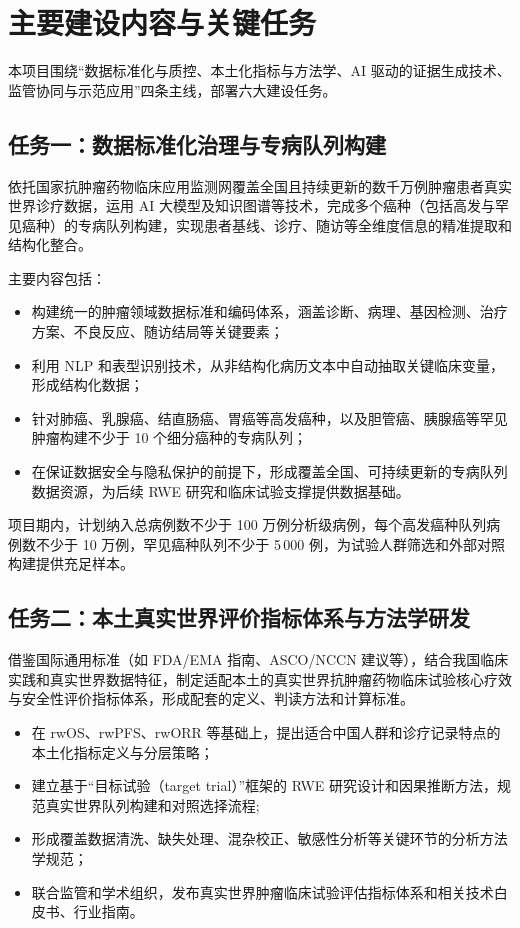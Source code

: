 \documentclass[12pt, a4paper, fontset=mac]{ctexart} %
\begin{document}
\section{主要建设内容与关键任务}

本项目围绕“数据标准化与质控、本土化指标与方法学、AI 驱动的证据生成技术、监管协同与示范应用”四条主线，部署六大建设任务。

\subsection*{任务一：数据标准化治理与专病队列构建}

依托国家抗肿瘤药物临床应用监测网覆盖全国且持续更新的数千万例肿瘤患者真实世界诊疗数据，运用 AI 大模型及知识图谱等技术，完成多个癌种（包括高发与罕见癌种）的专病队列构建，实现患者基线、诊疗、随访等全维度信息的精准提取和结构化整合\cite{ncc_internal_db}。

\vspace{0.5em}
主要内容包括：

\begin{itemize}
  \item 构建统一的肿瘤领域数据标准和编码体系，涵盖诊断、病理、基因检测、治疗方案、不良反应、随访结局等关键要素；
  \item 利用 NLP 和表型识别技术，从非结构化病历文本中自动抽取关键临床变量，形成结构化数据；
  \item 针对肺癌、乳腺癌、结直肠癌、胃癌等高发癌种，以及胆管癌、胰腺癌等罕见肿瘤构建不少于 10 个细分癌种的专病队列；
  \item 在保证数据安全与隐私保护的前提下，形成覆盖全国、可持续更新的专病队列数据资源，为后续 RWE 研究和临床试验支撑提供数据基础。
\end{itemize}

项目期内，计划纳入总病例数不少于 100 万例分析级病例，每个高发癌种队列病例数不少于 10 万例，罕见癌种队列不少于 5\,000 例，为试验人群筛选和外部对照构建提供充足样本。

\subsection*{任务二：本土真实世界评价指标体系与方法学研发}

借鉴国际通用标准（如 FDA/EMA 指南、ASCO/NCCN 建议等），结合我国临床实践和真实世界数据特征，制定适配本土的真实世界抗肿瘤药物临床试验核心疗效与安全性评价指标体系，形成配套的定义、判读方法和计算标准\cite{hernan_target_trial,arondekar_oncology_rwe}。

\begin{itemize}
  \item 在 rwOS、rwPFS、rwORR 等基础上，提出适合中国人群和诊疗记录特点的本土化指标定义与分层策略；
  \item 建立基于“目标试验（target trial）”框架的 RWE 研究设计和因果推断方法，规范真实世界队列构建和对照选择流程\cite{hernan_target_trial};
  \item 形成覆盖数据清洗、缺失处理、混杂校正、敏感性分析等关键环节的分析方法学规范；
  \item 联合监管和学术组织，发布真实世界肿瘤临床试验评估指标体系和相关技术白皮书、行业指南。
\end{itemize}
\end{document}
